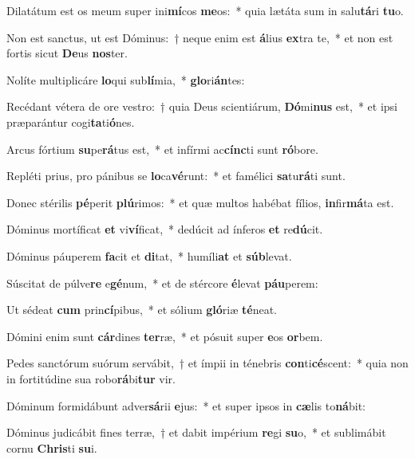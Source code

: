 \item Dilatátum est os meum super ini\textbf{mí}cos \textbf{me}os:~* quia lætáta sum in salu\textbf{tá}ri \textbf{tu}o.
\item Non est sanctus, ut est Dóminus:~† neque enim est \textbf{á}lius \textbf{ex}tra te,~* et non est fortis sicut \textbf{De}us \textbf{nos}ter.
\item Nolíte multiplicáre \textbf{lo}qui sub\textbf{lí}mia,~* \textbf{glo}ri\textbf{án}tes:
\item Recédant vétera de ore vestro:~† quia Deus scientiárum, \textbf{Dó}mi\textbf{nus} est,~* et ipsi præparántur cogi\textbf{ta}ti\textbf{ó}nes.
\item Arcus fórtium \textbf{su}pe\textbf{rá}tus est,~* et infírmi ac\textbf{cínc}ti sunt \textbf{ró}bore.
\item Repléti prius, pro pánibus se \textbf{lo}ca\textbf{vé}runt:~* et famélici \textbf{sa}tu\textbf{rá}ti sunt.
\item Donec stérilis \textbf{pé}perit \textbf{plú}rimos:~* et quæ multos habébat fílios, \textbf{in}fir\textbf{má}ta est.
\item Dóminus mortíficat \textbf{et} vi\textbf{ví}ficat,~* dedúcit ad ínferos \textbf{et} re\textbf{dú}cit.
\item Dóminus páuperem \textbf{fa}cit et \textbf{di}tat,~* humíli\textbf{at} et \textbf{súb}levat.
\item Súscitat de púlve\textbf{re} e\textbf{gé}num,~* et de stércore \textbf{é}levat \textbf{páu}perem:
\item Ut sédeat \textbf{cum} prin\textbf{cí}pibus,~* et sólium \textbf{gló}riæ \textbf{té}neat.
\item Dómini enim sunt \textbf{cár}dines \textbf{ter}ræ,~* et pósuit super \textbf{e}os \textbf{or}bem.
\item Pedes sanctórum suórum servábit,~† et ímpii in ténebris \textbf{con}ti\textbf{cé}scent:~* quia non in fortitúdine sua robo\textbf{rá}bi\textbf{tur} vir.
\item Dóminum formidábunt adver\textbf{sá}rii \textbf{e}jus:~* et super ipsos in \textbf{cæ}lis to\textbf{ná}bit:
\item Dóminus judicábit fines terræ,~† et dabit impérium \textbf{re}gi \textbf{su}o,~* et sublimábit cornu \textbf{Chris}ti \textbf{su}i.
